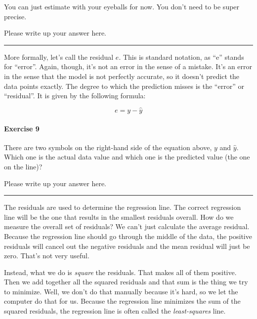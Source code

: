 \documentclass[
]{book}
\begin{document}
You can just estimate with your eyeballs for now. You don't need to be super precise.

Please write up your answer here.

\begin{center}\rule{0.5\linewidth}{0.5pt}\end{center}

More formally, let's call the residual \(e\). This is standard notation, as ``e'' stands for ``error''. Again, though, it's not an error in the sense of a mistake. It's an error in the sense that the model is not perfectly accurate, so it doesn't predict the data points exactly. The degree to which the prediction misses is the ``error'' or ``residual''. It is given by the following formula:

\[
e = y - \hat{y}
\]

\hypertarget{exercise-9-1}{%
\paragraph*{Exercise 9}\label{exercise-9-1}}

There are two symbols on the right-hand side of the equation above, \(y\) and \(\hat{y}\). Which one is the actual data value and which one is the predicted value (the one on the line)?

Please write up your answer here.

\begin{center}\rule{0.5\linewidth}{0.5pt}\end{center}

The residuals are used to determine the regression line. The correct regression line will be the one that results in the smallest residuals overall. How do we measure the overall set of residuals? We can't just calculate the average residual. Because the regression line should go through the middle of the data, the positive residuals will cancel out the negative residuals and the mean residual will just be zero. That's not very useful.

Instead, what we do is \emph{square} the residuals. That makes all of them positive. Then we add together all the squared residuals and that sum is the thing we try to minimize. Well, we don't do that manually because it's hard, so we let the computer do that for us. Because the regression line minimizes the sum of the squared residuals, the regression line is often called the \emph{least-squares} line.
\end{document}
